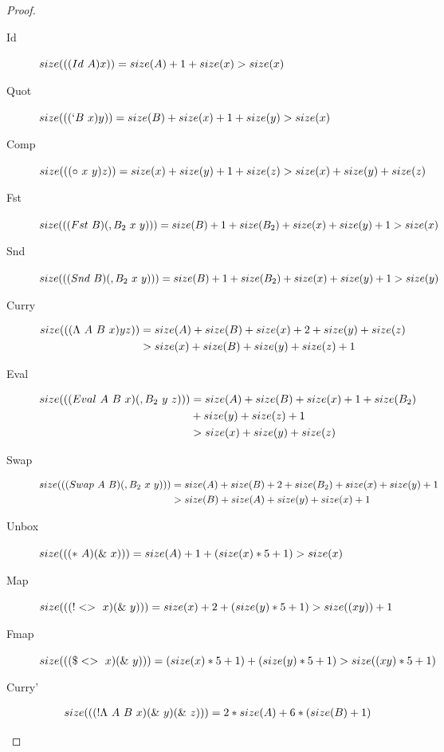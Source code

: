 \documentclass{lmcs}
\begin{document}
\begin{proof}
  \begin{description}
  \item[Id] \(size((\comb[Id][A] x)) = size(A) + 1 + size(x) > size(x)\)
  \item[Quot] \(size((\comb[`B][x] y)) = size(B) + size(x) + 1 + size(y) > size(x)\)
  \item[Comp] \(size((\comb[\circ][x][y] z)) = size(x) + size(y) + 1 + size(z) > size(x) + size(y) + size(z)\)
  \item[Fst] \(size((\comb[Fst][B] \comb[,B_2][x][y])) = size(B) + 1 + size(B_2) + size(x) + size(y) + 1 > size(x)\)
  \item[Snd] \(size((\comb[Snd][B] \comb[,B_2][x][y])) = size(B) + 1 + size(B_2) + size(x) + size(y) + 1 > size(y)\)
  \item[Curry]
  \begin{align*}
    size((\comb[\Lambda][A][B][x] y z)) &= size(A) + size(B) + size(x) + 2 + size(y) + size(z)\\
                                        & > size(x) + size(B) + size(y) + size(z) + 1
  \end{align*}
  \item[Eval]
  \begin{align*}
    size((\comb[Eval][A][B][x] \comb[,B_2][y][z])) &= size(A) + size(B) + size(x) + 1 + size(B_2)\\
                                                   & + size(y) + size(z) + 1\\
                                                   & > size(x) + size(y) + size(z)
  \end{align*}
  \item[Swap] \begin{align*}
    size((\comb[Swap][A][B] \comb[,B_2][x][y])) &= size(A) + size(B) + 2 + size(B_2) + size(x) + size(y) + 1\\
    & > size(B) + size(A) + size(y) + size(x) + 1
    \end{align*}
  \item[Unbox] \(size((\comb[*][A] \comb[\&][x])) = size(A) + 1 + (size(x) * 5 + 1) > size(x)\)
  \item[Map] \(size((\comb[!<>][x] \comb[\&][y])) = size(x) + 2 + (size(y) * 5 + 1) > size((x y)) + 1\)
  \item[Fmap] \(size((\comb[\$<>][x] \comb[\&][y])) = (size(x) * 5 + 1) + (size(y) * 5 + 1) > size((x y) * 5 + 1)\)
  \item[Curry']
    \begin{align*}
      size((\comb[!\Lambda][A][B][x] \comb[\&][y] \comb[\&][z])) &= 2 * size(A) + 6 * (size(B) + 1) &\\

\end{align*}
\end{description}
\end{proof}
\end{document}
